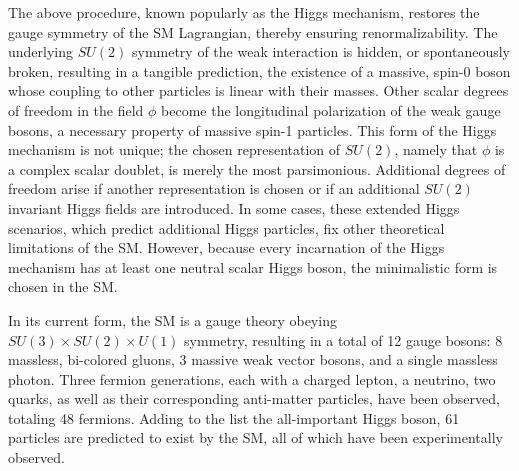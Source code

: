 The above procedure, known popularly as the Higgs mechanism, restores the gauge
symmetry of the SM Lagrangian, thereby ensuring
renormalizability. The underlying $SU(2)$ symmetry of the weak
interaction is hidden, or spontaneously broken, resulting in a
tangible prediction, the existence of a massive, spin-0 boson whose
coupling to other particles is linear with their masses. Other scalar
degrees of freedom in the field $\phi$ become the longitudinal
polarization of the weak gauge bosons, a necessary property of massive
spin-1 particles. This form of the Higgs mechanism is not unique; the
chosen representation of $SU(2)$, namely that $\phi$ is a complex
scalar doublet, is merely the most parsimonious. Additional degrees of
freedom arise if another representation is chosen or if an additional
$SU(2)$ invariant Higgs fields are introduced. In some cases, these
extended Higgs scenarios, which predict additional Higgs particles,
fix other theoretical limitations of the SM. However, because every
incarnation of the Higgs mechanism has at least one neutral scalar Higgs boson,
the minimalistic form is chosen in the SM. 

In its current form, the SM is a gauge theory obeying $SU(3) \times
SU(2) \times U(1)$ symmetry, resulting in a total of 12 gauge bosons:
8 massless, bi-colored gluons, 3 massive weak vector bosons, and a
single massless photon. Three fermion generations, each with a charged
lepton, a neutrino, two quarks, as well as their corresponding
anti-matter particles, have been observed, totaling 48
fermions. Adding to the list the all-important Higgs boson, 61
particles are predicted to exist by the SM, all of which have been
experimentally observed. 




